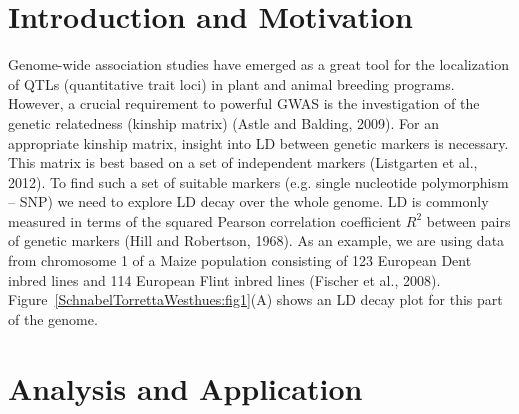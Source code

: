 \documentclass[twoside]{report}
\begin{document}
\section{Introduction and Motivation}
Genome-wide association studies have emerged as a great tool for the 
localization of QTLs (quantitative trait loci) in plant and animal breeding programs.
However, a crucial requirement to powerful GWAS is the investigation of the genetic 
relatedness (kinship matrix) (Astle and Balding, 2009). 
For an appropriate kinship matrix, insight into LD between 
genetic markers is necessary. This matrix is best based on a set of independent markers 
(Listgarten et al., 2012).
To find such a set of suitable markers (e.g. single nucleotide polymorphism -- SNP) we need 
to explore LD decay over the whole genome. LD is commonly measured in terms of 
the squared Pearson correlation coefficient $R^2$ between pairs of genetic
markers (Hill and Robertson, 1968). As an example, we are using data from chromosome 1 of a Maize 
population consisting of 123 European Dent inbred lines and 114 European Flint inbred lines
(Fischer et al., 2008). Figure~\ref{SchnabelTorrettaWesthues:fig1}(A) shows an LD decay plot 
for this part of the genome. 

\section{Analysis and Application}
\end{document}
